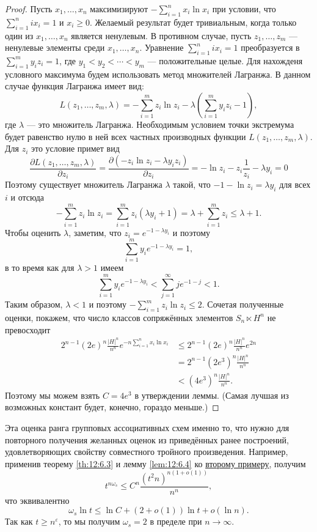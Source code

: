 \begin{proof}
  Пусть $x_1, \dotsc, x_n$ максимизируют $-\sum_{i=1}^n x_i \ln x_i$ при условии, что $\sum_{i=1}^n i x_i = 1$ и $x_i \geq 0$. Желаемый результат будет тривиальным, когда только один из $x_1, \dotsc, x_n$ является ненулевым. В противном случае, пусть $z_1, \dotsc, z_m$ --- ненулевые элементы среди $x_1, \dotsc, x_n$. Уравнение $\sum_{i=1}^n i x_i = 1$ преобразуется в $\sum_{i=1}^m y_i z_i = 1$, где $y_1 < y_2 < \dotsb < y_m$ --- положительные целые. Для нахожденя условного максимума будем использовать метод множителей Лагранжа. В данном случае функция Лагранжа имеет вид:
  \[
  	L(z_1, \dotsc, z_m, \lambda) = -\sum_{i=1}^m z_i \ln z_i - \lambda \left( \sum_{i=1}^m y_i z_i - 1 \right),
  \]  
  где $\lambda$ --- это множитель Лагранжа. Необходимым условием точки экстремума будет равенство нулю в ней всех частных производных функции $L(z_1, \dotsc, z_m, \lambda)$. Для $z_i$ это условие примет вид
  \[
       \frac{\partial L(z_1, \dotsc, z_m, \lambda)}{\partial z_i} = \frac{\partial (-z_i \ln z_i - \lambda y_i z_i)}{\partial z_i} = -\ln z_i - z_i \frac{1}{z_i} - \lambda y_i = 0
  \]
  Поэтому существует множитель Лагранжа $\lambda$ такой, что $-1-\ln z_i = \lambda y_i$ для всех $i$ и отсюда
  \[
  	- \sum_{i=1}^m z_i \ln z_i = \sum_{i=1}^m z_i (\lambda y_i + 1) = \lambda + \sum_{i=1}^m z_i \leq \lambda + 1.
  \]
  Чтобы оценить $\lambda$, заметим, что $z_i = e^{-1-\lambda y_i}$ и поэтому
  \[
  	\sum_{i=1}^m y_i e^{-1-\lambda y_i} = 1,
  \]
  в то время как для $\lambda > 1$ имеем
  \[
  	\sum_{i=1}^m y_i e^{-1-\lambda y_i} < \sum_{j=1}^\infty j e^{-1-j} < 1.
  \]
  Таким образом, $\lambda < 1$ и поэтому $-\sum_{i=1}^m z_i \ln z_i \leq 2$. Сочетая полученные оценки, покажем, что число классов сопряжённых элементов $S_n \ltimes H^n$ не превосходит
  \begin{align*}
    2^{n-1} (2e)^n \frac{|H|^n}{n^n} e^{-n \sum_{i=1}^n x_i \ln x_i} & \leq 2^{n-1} (2e)^n \frac{|H|^n}{n^n} e^{2n} \\
    & = 2^{n-1} (2 e^3)^n \frac{|H|^n}{n^n} \\
    & < (4 e^3)^n \frac{|H|^n}{n^n}.
  \end{align*}
  Поэтому мы можем взять $C = 4 e^3$ в утверждении леммы. (Самая лучшая из возможных констант будет, конечно, гораздо меньше.)
\end{proof}

Эта оценка ранга групповых ассоциативных схем именно то, что нужно для повторного получения желанных оценок из приведённых ранее построений, удовлетворяющих свойству совместного тройного произведения. Например, применив теорему \ref{th:12:6.3} и лемму \ref{lem:12:6.4} ко \hyperref[it:2:gas]{второму примеру}, получим
\[
	t^{n \omega_s} \leq C^n \frac{(t^2 n)^{n(1+o(1))}}{n^n},
\]
что эквивалентно
\[
	\omega_s \ln t \leq \ln C + (2 + o(1)) \ln t + o(\ln n).
\]
Так как $t \geq n^\varepsilon$, то мы получим $\omega_s=2$ в пределе при $n \to \infty$.


